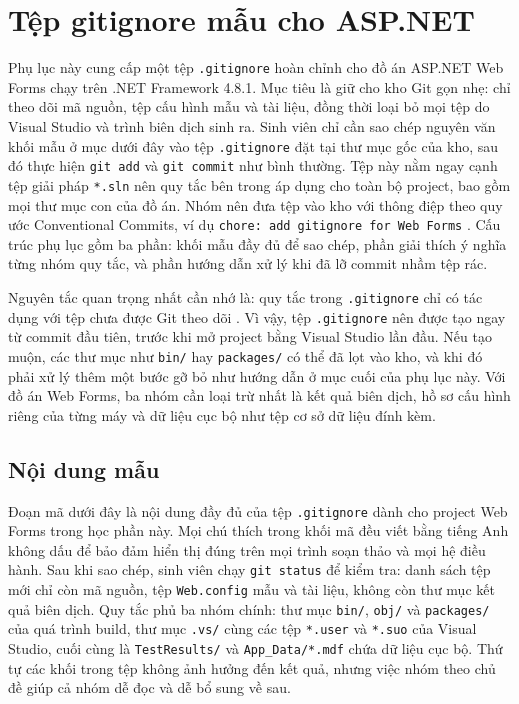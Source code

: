 \section{Tệp gitignore mẫu cho ASP.NET}
\label{sec:pb-gitignore}

Phụ lục này cung cấp một tệp \verb|.gitignore| hoàn chỉnh cho đồ án ASP.NET Web Forms chạy trên .NET Framework 4.8.1.
Mục tiêu là giữ cho kho Git gọn nhẹ: chỉ theo dõi mã nguồn, tệp cấu hình mẫu và tài liệu, đồng thời loại bỏ mọi tệp do Visual Studio và trình biên dịch sinh ra.
Sinh viên chỉ cần sao chép nguyên văn khối mẫu ở mục dưới đây vào tệp \verb|.gitignore| đặt tại thư mục gốc của kho, sau đó thực hiện \verb|git add| và \verb|git commit| như bình thường.
Tệp này nằm ngay cạnh tệp giải pháp \verb|*.sln| nên quy tắc bên trong áp dụng cho toàn bộ project, bao gồm mọi thư mục con của đồ án.
Nhóm nên đưa tệp vào kho với thông điệp theo quy ước Conventional Commits, ví dụ \verb|chore: add gitignore for Web Forms| \cite{convcommits}.
Cấu trúc phụ lục gồm ba phần: khối mẫu đầy đủ để sao chép, phần giải thích ý nghĩa từng nhóm quy tắc, và phần hướng dẫn xử lý khi đã lỡ commit nhầm tệp rác.

Nguyên tắc quan trọng nhất cần nhớ là: quy tắc trong \verb|.gitignore| chỉ có tác dụng với tệp chưa được Git theo dõi \cite{progit,githubdocs}.
Vì vậy, tệp \verb|.gitignore| nên được tạo ngay từ commit đầu tiên, trước khi mở project bằng Visual Studio lần đầu.
Nếu tạo muộn, các thư mục như \verb|bin/| hay \verb|packages/| có thể đã lọt vào kho, và khi đó phải xử lý thêm một bước gỡ bỏ như hướng dẫn ở mục cuối của phụ lục này.
Với đồ án Web Forms, ba nhóm cần loại trừ nhất là kết quả biên dịch, hồ sơ cấu hình riêng của từng máy và dữ liệu cục bộ như tệp cơ sở dữ liệu đính kèm.

\subsection{Nội dung mẫu}

Đoạn mã dưới đây là nội dung đầy đủ của tệp \verb|.gitignore| dành cho project Web Forms trong học phần này.
Mọi chú thích trong khối mã đều viết bằng tiếng Anh không dấu để bảo đảm hiển thị đúng trên mọi trình soạn thảo và mọi hệ điều hành.
Sau khi sao chép, sinh viên chạy \verb|git status| để kiểm tra: danh sách tệp mới chỉ còn mã nguồn, tệp \verb|Web.config| mẫu và tài liệu, không còn thư mục kết quả biên dịch.
Quy tắc phủ ba nhóm chính: thư mục \verb|bin/|, \verb|obj/| và \verb|packages/| của quá trình build, thư mục \verb|.vs/| cùng các tệp \verb|*.user| và \verb|*.suo| của Visual Studio, cuối cùng là \verb|TestResults/| và \verb|App_Data/*.mdf| chứa dữ liệu cục bộ.
Thứ tự các khối trong tệp không ảnh hưởng đến kết quả, nhưng việc nhóm theo chủ đề giúp cả nhóm dễ đọc và dễ bổ sung về sau.

